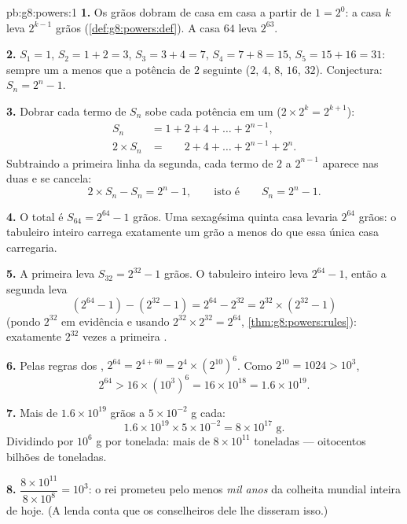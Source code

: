 \begin{solution}{pb:g8:powers:1}
\textbf{1.} Os grãos dobram de casa em casa a partir de $1 = 2^0$: a
casa $k$ leva $2^{k-1}$ grãos (\cref{def:g8:powers:def}). A casa $64$
leva $2^{63}$.

\textbf{2.} $S_1 = 1$, $S_2 = 1 + 2 = 3$, $S_3 = 3 + 4 = 7$,
$S_4 = 7 + 8 = 15$, $S_5 = 15 + 16 = 31$: sempre um a menos que a
potência de $2$ seguinte ($2$, $4$, $8$, $16$, $32$). Conjectura:
$S_n = 2^n - 1$.

\textbf{3.} Dobrar cada termo de $S_n$ sobe cada potência em um
($2 \times 2^{k} = 2^{k+1}$):
\begin{align*}
S_n &= 1 + 2 + 4 + \dots + 2^{n-1}, \\
2 \times S_n &= \phantom{1 + {}} 2 + 4 + \dots + 2^{n-1} + 2^n .
\end{align*}
Subtraindo a primeira linha da segunda, cada termo de $2$ a $2^{n-1}$
aparece nas duas e se cancela:
\[
2 \times S_n - S_n = 2^n - 1,
\qquad\text{isto é}\qquad
S_n = 2^n - 1 .
\]

\textbf{4.} O total é $S_{64} = 2^{64} - 1$ grãos. Uma sexagésima
quinta casa levaria $2^{64}$ grãos: o tabuleiro inteiro carrega
exatamente um grão a menos do que essa única casa carregaria.

\textbf{5.} A primeira  leva $S_{32} = 2^{32} - 1$ grãos. O
tabuleiro inteiro leva $2^{64} - 1$, então a segunda  leva
\[
\left(2^{64} - 1\right) - \left(2^{32} - 1\right)
= 2^{64} - 2^{32}
= 2^{32} \times \left(2^{32} - 1\right)
\]
(pondo $2^{32}$ em evidência e usando
$2^{32} \times 2^{32} = 2^{64}$, \cref{thm:g8:powers:rules}):
exatamente $2^{32}$ vezes a primeira .

\textbf{6.} Pelas regras dos ,
$2^{64} = 2^{4 + 60} = 2^4 \times \left(2^{10}\right)^6$. Como
$2^{10} = 1024 > 10^3$,
\[
2^{64} > 16 \times \left(10^3\right)^6 = 16 \times 10^{18}
= 1.6 \times 10^{19} .
\]

\textbf{7.} Mais de $1.6 \times 10^{19}$ grãos a
$5 \times 10^{-2}$ g cada:
\[
1.6 \times 10^{19} \times 5 \times 10^{-2}
= 8 \times 10^{17} \text{ g} .
\]
Dividindo por $10^6$ g por tonelada: mais de $8 \times 10^{11}$
toneladas --- oitocentos bilhões de toneladas.

\textbf{8.} $\dfrac{8 \times 10^{11}}{8 \times 10^{8}} = 10^3$: o rei
prometeu pelo menos \emph{mil anos} da colheita mundial inteira de
hoje. (A lenda conta que os conselheiros dele lhe disseram isso.)


\end{solution}
